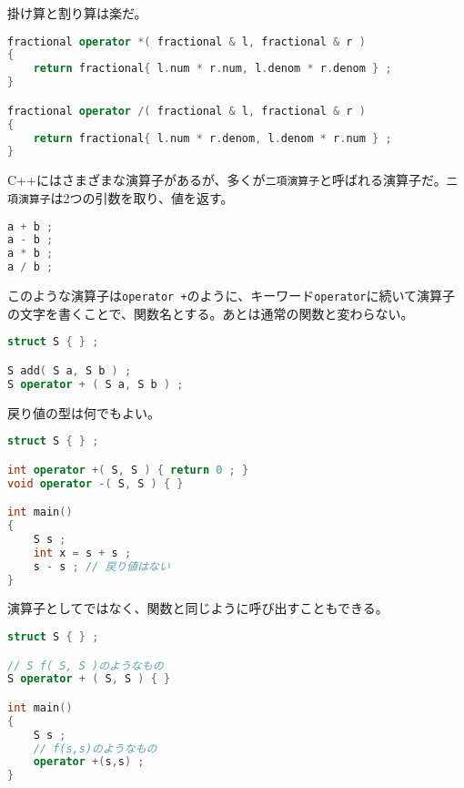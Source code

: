 掛け算と割り算は楽だ。

\begin{lstlisting}[language={C++}]
fractional operator *( fractional & l, fractional & r )
{
    return fractional{ l.num * r.num, l.denom * r.denom } ;
}

fractional operator /( fractional & l, fractional & r )
{
    return fractional{ l.num * r.denom, l.denom * r.num } ;
}
\end{lstlisting}

\clearpage
{}


C++にはさまざまな演算子があるが、多くが\texttt{二項演算子}と呼ばれる演算子だ。\texttt{二項演算子}は2つの引数を取り、値を返す。

\begin{lstlisting}[language={C++}]
a + b ;
a - b ;
a * b ;
a / b ;
\end{lstlisting}

このような演算子は\texttt{operator +}のように、キーワード\texttt{operator}に続いて演算子の文字を書くことで、関数名とする。あとは通常の関数と変わらない。

\begin{lstlisting}[language={C++}]
struct S { } ;

S add( S a, S b ) ;
S operator + ( S a, S b ) ;
\end{lstlisting}

戻り値の型は何でもよい。

\begin{lstlisting}[language={C++}]
struct S { } ;

int operator +( S, S ) { return 0 ; }
void operator -( S, S ) { }

int main()
{
    S s ;
    int x = s + s ;
    s - s ; // 戻り値はない
}
\end{lstlisting}

演算子としてではなく、関数と同じように呼び出すこともできる。

\begin{lstlisting}[language={C++}]
struct S { } ;

// S f( S, S )のようなもの
S operator + ( S, S ) { }

int main()
{
    S s ;
    // f(s,s)のようなもの
    operator +(s,s) ;
}
\end{lstlisting}

